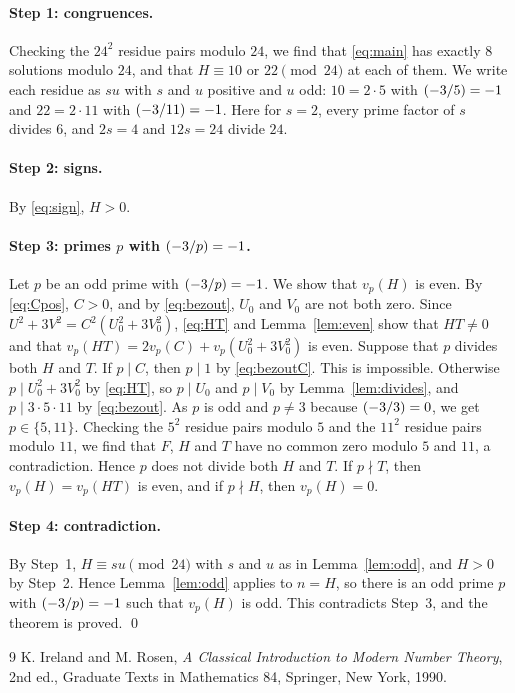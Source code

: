 \documentclass[11pt]{article}
\newcommand{\leg}[2]{\mathchoice{\biggl(\dfrac{#1}{#2}\biggr)}{(#1/#2)}{(#1/#2)}{(#1/#2)}}
\begin{document}
\paragraph{Step 1: congruences.} Checking the $24^2$ residue pairs modulo $24$, we find that \eqref{eq:main} has exactly 8 solutions modulo $24$, and that $H\equiv10\text{ or }22\pmod{24}$ at each of them. We write each residue as $su$ with $s$ and $u$ positive and $u$ odd: $10=2\cdot5$ with $\leg{-3}{5}=-1$ and $22=2\cdot11$ with $\leg{-3}{11}=-1$. Here for $s=2$, every prime factor of $s$ divides $6$, and $2s=4$ and $12s=24$ divide $24$.

\paragraph{Step 2: signs.} By \eqref{eq:sign}, $H>0$.

\paragraph{\texorpdfstring{Step 3: primes $p$ with $\leg{-3}{p}=-1$.}{Step 3: inert primes.}} Let $p$ be an odd prime with $\leg{-3}{p}=-1$. We show that $v_p(H)$ is even. By \eqref{eq:Cpos}, $C>0$, and by \eqref{eq:bezout}, $U_0$ and $V_0$ are not both zero. Since $U^2+3V^2=C^2(U_0^2+3V_0^2)$, \eqref{eq:HT} and Lemma~\ref{lem:even} show that $HT\neq0$ and that $v_p(HT)=2v_p(C)+v_p(U_0^2+3V_0^2)$ is even. Suppose that $p$ divides both $H$ and $T$. If $p\mid C$, then $p\mid 1$ by \eqref{eq:bezoutC}. This is impossible. Otherwise $p\mid U_0^2+3V_0^2$ by \eqref{eq:HT}, so $p\mid U_0$ and $p\mid V_0$ by Lemma~\ref{lem:divides}, and $p\mid 3\cdot 5\cdot 11$ by \eqref{eq:bezout}. As $p$ is odd and $p\neq3$ because $\leg{-3}{3}=0$, we get $p\in\{5,11\}$. Checking the $5^2$ residue pairs modulo $5$ and the $11^2$ residue pairs modulo $11$, we find that $F$, $H$ and $T$ have no common zero modulo $5$ and $11$, a contradiction. Hence $p$ does not divide both $H$ and $T$. If $p\nmid T$, then $v_p(H)=v_p(HT)$ is even, and if $p\nmid H$, then $v_p(H)=0$.

\paragraph{Step 4: contradiction.} By Step~1, $H\equiv su\pmod{24}$ with $s$ and $u$ as in Lemma~\ref{lem:odd}, and $H>0$ by Step~2. Hence Lemma~\ref{lem:odd} applies to $n=H$, so there is an odd prime $p$ with $\leg{-3}{p}=-1$ such that $v_p(H)$ is odd. This contradicts Step~3, and the theorem is proved.
\qed

\begin{thebibliography}{9}
 K. Ireland and M. Rosen, \emph{A Classical Introduction to Modern Number Theory}, 2nd ed., Graduate Texts in Mathematics 84, Springer, New York, 1990.
\end{thebibliography}
\end{document}
